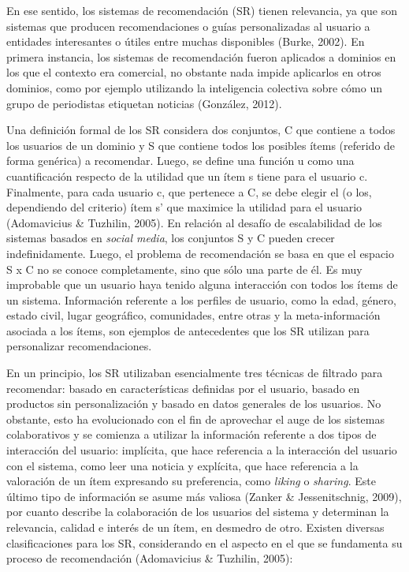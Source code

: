 En ese sentido, los sistemas de recomendación (SR) tienen relevancia, ya que son sistemas que producen recomendaciones o guías personalizadas al usuario a entidades interesantes o útiles entre muchas disponibles (Burke, 2002).  En primera instancia, los sistemas de recomendación fueron aplicados a dominios en los que el contexto era comercial, no obstante nada impide aplicarlos en otros dominios, como por ejemplo utilizando la inteligencia colectiva sobre cómo un grupo de periodistas etiquetan noticias (González, 2012).

Una definición formal de los SR considera dos conjuntos, C que contiene a todos los usuarios de un dominio y S que contiene todos los posibles ítems (referido de forma genérica) a recomendar. Luego, se define una función u como una cuantificación respecto de la utilidad que un ítem s tiene para el usuario c. Finalmente, para cada usuario c, que pertenece a C, se debe elegir el (o los, dependiendo del criterio) ítem s’ que maximice la utilidad para el usuario (Adomavicius & Tuzhilin, 2005). En relación al desafío de escalabilidad de los sistemas basados en \textit{social media}, los conjuntos S y C pueden crecer indefinidamente. Luego, el problema de recomendación se basa en que el espacio S x C no se conoce completamente, sino que sólo una parte de él. Es muy improbable que un usuario haya tenido alguna interacción con todos los ítems de un sistema. Información referente a los perfiles de usuario, como la edad, género, estado civil, lugar geográfico, comunidades, entre otras y la meta-información asociada a los ítems, son ejemplos de antecedentes que los SR utilizan para personalizar recomendaciones.

En un principio, los SR utilizaban esencialmente tres técnicas de filtrado para recomendar: basado en características definidas por el usuario, basado en productos sin personalización y basado en datos generales de los usuarios. No obstante, esto ha evolucionado con el fin de aprovechar el auge de los sistemas colaborativos y se comienza a utilizar la información referente a dos tipos de interacción del usuario: implícita, que hace referencia a la interacción del usuario con el sistema, como leer una noticia y explícita, que hace referencia a la valoración de un ítem expresando su preferencia, como \textit{liking} o \textit{sharing}. Este último tipo de información se asume más valiosa (Zanker & Jessenitschnig, 2009), por cuanto describe la colaboración de los usuarios del sistema y determinan la relevancia, calidad e interés de un ítem, en desmedro de otro. Existen diversas clasificaciones para los SR, considerando en el aspecto en el que se fundamenta su proceso de recomendación (Adomavicius & Tuzhilin, 2005):


